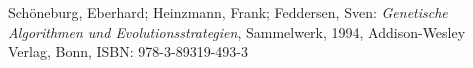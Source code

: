 
\begin{thebibliography}{99}

	Schöneburg, Eberhard; Heinzmann, Frank; Feddersen, Sven:
	\emph{Genetische Algorithmen und Evolutionsstrategien},
	Sammelwerk,
	1994,
	Addison-Wesley Verlag,
	Bonn,
	ISBN: 978-3-89319-493-3
	
	
\end{thebibliography}

